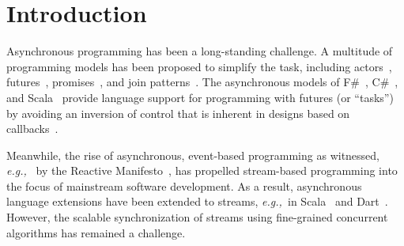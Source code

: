 \documentclass[runningheads]{llncs}
\newcommand{\eg}{{\em e.g.,~}}
\begin{document}
\begin{sloppypar}
\begin{abstract}

Asynchronous programming has been a long-standing challenge. Meanwhile, the
rise of asynchronous, event-based programming, as witnessed, \eg by the
Reactive Manifesto, has propelled stream-based programming into the focus of
mainstream software development.

This paper proposes a new approach to {\em scalable and declarative
synchronization of asynchronous event streams} based on join
patterns. Instead of introducing a new, incompatible
programming model, we present a new synchronization construct for an existing,
widely-used programming model for asynchronous streams. In order to support
the ordering constraints of streams, we adapt Turon and Russo's scalable
join-pattern matching algorithm. Furthermore, our join
synchronization construct enables integrating with flow-control mechanisms of
stream-based programming models. Experimental results using micro
benchmarks show an average increase in throughput of 30-36\% compared to
the standard joins implementation of \textsc{RxJava}, a state-of-the-art
streaming implementation for the JVM.

\end{abstract}


\section{Introduction}
\label{sec:introduction}

Asynchronous programming has been a long-standing challenge. A multitude of
programming models has been proposed to simplify the task, including
actors~\cite{Hewitt77}, futures~\cite{Halstead85}, promises~\cite{LiskovS88},
and join patterns~\cite{Fournet:1996}. The asynchronous models of
F\#~\cite{SymePL11}, C\#~\cite{FormalizingAsync}, and
Scala~\cite{ScalaAsyncSIP} provide language support for programming with
futures (or ``tasks'') by avoiding an inversion of control that is inherent
in designs based on callbacks~\cite{John88a}.

Meanwhile, the rise of asynchronous, event-based programming as witnessed, \eg
by the Reactive Manifesto~\cite{ReactiveManifesto}, has propelled stream-based
programming into the focus of mainstream software development. As a result,
asynchronous language extensions have been extended to streams, \eg in
Scala~\cite{RAY} and Dart~\cite{MeijerMB15}. However, the scalable
synchronization of streams using fine-grained concurrent algorithms has
remained a challenge.


\end{sloppypar}
\end{document}

